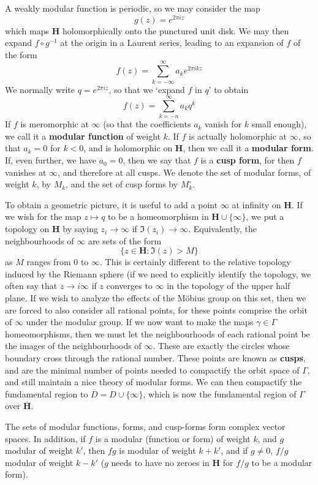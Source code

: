 A weakly modular function is periodic, so we may consider the map
%
\[ g(z) = e^{2 \pi i z} \]
%
which maps $\mathbf{H}$ holomorphically onto the punctured unit disk. We may then expand $f \circ g^{-1}$ at the origin in a Laurent series, leading to an expansion of $f$ of the form
%
\[ f(z) = \sum_{k = -\infty}^\infty a_k e^{2 \pi i k z} \]
%
We normally write $q = e^{2 \pi i z}$, so that we `expand $f$ in $q$' to obtain
%
\[ f(z) = \sum_{k = -n}^\infty a_k q^k \]
%
If $f$ is meromorphic at $\infty$ (so that the coefficients $a_k$ vanish for $k$ small enough), we call it a {\bf modular function} of weight $k$. If $f$ is actually holomorphic at $\infty$, so that $a_k = 0$ for $k < 0$, and is holomorphic on $\mathbf{H}$, then we call it a {\bf modular form}. If, even further, we have $a_0 = 0$, then we say that $f$ is a {\bf cusp form}, for then $f$ vanishes at $\infty$, and therefore at all cusps. We denote the set of modular forms, of weight $k$, by $M_k$, and the set of cusp forms by $M_k^\circ$.

To obtain a geometric picture, it is useful to add a point $\infty$ at infinity on $\mathbf{H}$. If we wish for the map $z \mapsto q$ to be a homeomorphism in $\mathbf{H} \cup \{ \infty \}$, we put a topology on $\mathbf{H}$ by saying $z_i \to \infty$ if $\Im(z_i) \to \infty$. Equivalently, the neighbourhoods of $\infty$ are sets of the form
%
\[ \{ z \in \mathbf{H} : \Im(z) > M \} \]
%
as $M$ ranges from $0$ to $\infty$. This is certainly different to the relative topology induced by the Riemann sphere (if we need to explicitly identify the topology, we often say that $z \to i \infty$ if $z$ converges to $\infty$ in the topology of the upper half plane. If we wish to analyze the effects of the M\"{o}bius group on this set, then we are forced to also consider all rational points, for these points comprise the orbit of $\infty$ under the modular group. If we now want to make the maps $\gamma \in \Gamma$ homeomorphisms, then we must let the neighbourhoods of each rational point be the images of the neighbourhoods of $\infty$. These are exactly the circles whose boundary cross through the rational number. These points are known as {\bf cusps}, and are the minimal number of points needed to compactify the orbit space of $\Gamma$, and still maintain a nice theory of modular forms. We can then compactify the fundamental region to $\overline{D} = D \cup \{ \infty \}$, which is now the fundamental region of $\Gamma$ over $\overline{\mathbf{H}}$.

The sets of modular functions, forms, and cusp-forms form complex vector spaces. In addition, if $f$ is a modular (function or form) of weight $k$, and $g$ modular of weight $k'$, then $fg$ is modular of weight $k + k'$, and if $g \neq 0$, $f/g$ modular of weight $k - k'$ ($g$ needs to have no zeroes in $\mathbf{H}$ for $f/g$ to be a modular form).

